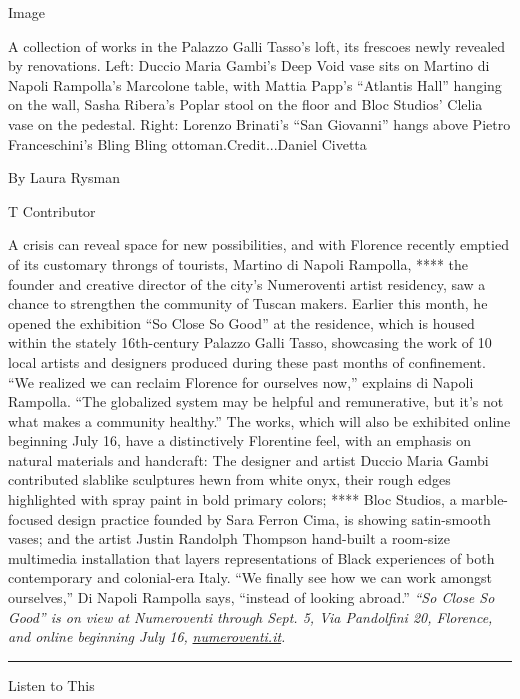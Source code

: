 Image

A collection of works in the Palazzo Galli Tasso's loft, its frescoes
newly revealed by renovations. Left: Duccio Maria Gambi's Deep Void vase
sits on Martino di Napoli Rampolla's Marcolone table, with Mattia Papp's
``Atlantis Hall'' hanging on the wall, Sasha Ribera's Poplar stool on
the floor and Bloc Studios' Clelia vase on the pedestal. Right: Lorenzo
Brinati's ``San Giovanni'' hangs above Pietro Franceschini's Bling Bling
ottoman.Credit...Daniel Civetta

By Laura Rysman

T Contributor

A crisis can reveal space for new possibilities, and with Florence
recently emptied of its customary throngs of tourists, Martino di Napoli
Rampolla, **** the founder and creative director of the city's
Numeroventi artist residency, saw a chance to strengthen the community
of Tuscan makers. Earlier this month, he opened the exhibition ``So
Close So Good'' at the residence, which is housed within the stately
16th-century Palazzo Galli Tasso, showcasing the work of 10 local
artists and designers produced during these past months of confinement.
``We realized we can reclaim Florence for ourselves now,'' explains di
Napoli Rampolla. ``The globalized system may be helpful and
remunerative, but it's not what makes a community healthy.'' The works,
which will also be exhibited online beginning July 16, have a
distinctively Florentine feel, with an emphasis on natural materials and
handcraft: The designer and artist Duccio Maria Gambi contributed
slablike sculptures hewn from white onyx, their rough edges highlighted
with spray paint in bold primary colors; **** Bloc Studios, a
marble-focused design practice founded by Sara Ferron Cima, is showing
satin-smooth vases; and the artist Justin Randolph Thompson hand-built a
room-size multimedia installation that layers representations of Black
experiences of both contemporary and colonial-era Italy. ``We finally
see how we can work amongst ourselves,'' Di Napoli Rampolla says,
``instead of looking abroad.'' \emph{``So Close So Good'' is on view at
Numeroventi through Sept. 5, Via Pandolfini 20, Florence, and online
beginning July 16,}
\href{https://www.numeroventi.it/}{\emph{numeroventi.it}}\emph{.}

\begin{center}\rule{0.5\linewidth}{\linethickness}\end{center}

Listen to This


